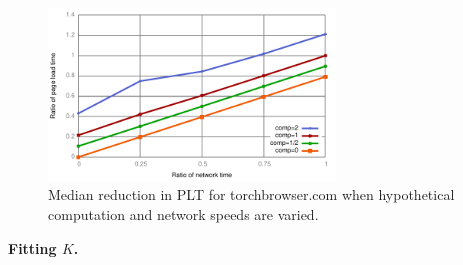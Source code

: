 \begin{figure}[t]
    \figuretitle{}
    \includegraphics[width=3in]{../graphs/whatif/ilivid.pdf}
    \caption[]{\label{fig:whatif} Median reduction in PLT
    for torchbrowser.com when hypothetical computation and network speeds are varied.}
\end{figure}

{\bf Fitting $K$.}

